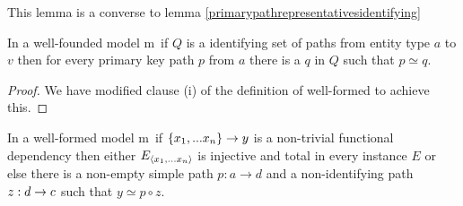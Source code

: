 \documentclass[10pt,a4paper]{article}
\newcommand{\genericmodel}{\mathcal{M}}
\renewcommand{\genericmodel}{{m}}
\newcommand{\veee}{v}
\newcommand{\ntuple}[1]{\tuple{#1_1,...#1_n}}
\newcommand {\xntuple}{\ensuremath{\ntuple{x}}}
\begin{document}
This lemma is a converse to lemma \ref{primarypathrepresentativesidentifying}
\begin{lemma} 
\label{identifyingconverse}
In a well-founded model \genericmodel\ if $Q$ is a identifying set of paths from entity type $a$ to $\veee$
then for every primary key path $p$ from $a$ there is a $q$ in $Q$ such that $p \simeq q$.
\end{lemma}
\begin{proof}
We have modified clause (i) of the definition of well-formed to achieve this.
\end{proof}

\begin{lemma}
\label{mainlemma}
In a well-formed model \genericmodel\ if $\{x_1,...x_n\} \rightarrow y$  is a non-trivial
functional dependency then either $E_{\xntuple}$ is injective and total in every instance $E$ 
or else there is a non-empty  simple path $p:a \rightarrow d$
and a non-identifying path $z:d \rightarrow c$ such that $y \simeq p \circ z$.
\end{lemma}
\end{document}
